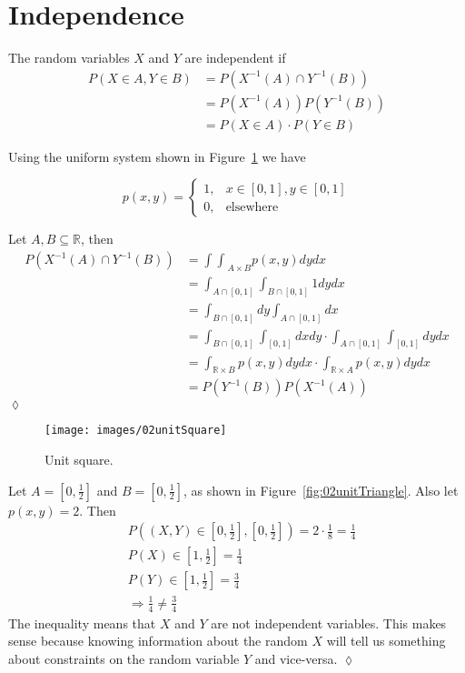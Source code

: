\section{Independence}
\begin{definition}
The random variables $X$ and $Y$ are independent if
\begin{align*}
P(X\in A, Y\in B) &= P(X^{-1}(A) \cap Y^{-1}(B)) \\
&= P(X^{-1}(A)) P(Y^{-1}(B)) \\
&= P(X\in A) \cdot P(Y\in B)
\end{align*}
\end{definition}

\begin{example}
Using the uniform system shown in Figure~\ref{fig:02unitSquare} we have

\begin{equation*}
p(x,y) = \begin{cases} 1, & x\in[0,1],y\in[0,1] \\ 0, & \text{elsewhere} \end{cases}
\end{equation*}

Let $A,B\subseteq\mathbb{R}$, then
\begin{align*}
P(X^{-1}(A) \cap Y^{-1}(B)) &= {\int\int}_{A\times B} p(x,y)dydx \\
&= \int_{A\cap[0,1]}\int_{B\cap[0,1]} 1 dydx \\
&= \int_{B\cap[0,1]}dy \int_{A\cap[0,1]}dx \\
&= \int_{B\cap[0,1]}\int_{[0,1]}dxdy \cdot \int_{A\cap[0,1]}\int_{[0,1]}dydx \\
&= \int_{\mathbb{R}\times B}p(x,y)dydx \cdot \int_{\mathbb{R}\times A}p(x,y)dydx \\
&= P(Y^{-1}(B)) P(X^{-1}(A))
\end{align*}
$\lozenge$
\end{example}

\begin{figure}[ht!]
\centering
\texttt{[image: images/02unitSquare]}
\caption{Unit square.}%
\label{fig:02unitSquare}
\end{figure}

\begin{example}
Let $A=[0,\frac{1}{2}]$ and $B=[0,\frac{1}{2}]$, as shown in Figure~\ref{fig:02unitTriangle}.
Also let $p(x,y)=2$.
Then
\begin{align*}
&P((X,Y)\in [0,\frac{1}{2}],[0,\frac{1}{2}]) = 2\cdot \frac{1}{8} = \frac{1}{4} \\
&P(X)\in[1,\frac{1}{2}] = \frac{1}{4} \\
&P(Y)\in[1,\frac{1}{2}] = \frac{3}{4} \\
&\Rightarrow \frac{1}{4} \neq \frac{3}{4}
\end{align*}
The inequality means that $X$ and $Y$ are not independent variables.
This makes sense because knowing information about the random $X$ will tell us something about constraints on the random variable $Y$ and vice-versa.
$\lozenge$
\end{example}

